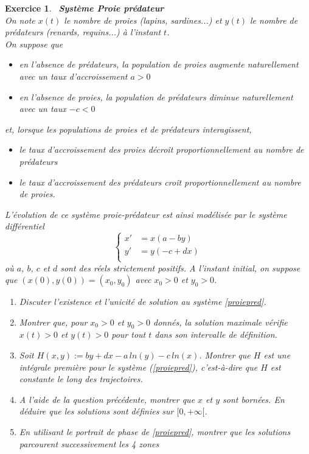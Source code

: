 \documentclass[11pt]{article}
\theoremstyle{exostyle}
\newtheorem{exercice}{Exercice}
\begin{document}
\begin{exercice}~{\bf Système Proie prédateur} \\
On note $x(t)$ le nombre de proies (lapins, sardines...) et $y(t)$ le nombre de prédateurs (renards, requins...) à l'instant $t$. \\
On suppose que 
\begin{itemize}
\item en l'absence de prédateurs, la population de  proies augmente naturellement avec un taux d'accroissement $a>0$ 
\item en l'absence de proies, la population de prédateurs diminue naturellement avec un taux $-c<0$
\end{itemize}
et, lorsque les populations de proies et de prédateurs interagissent,
\begin{itemize}
\item le taux d'accroissement des proies décroît proportionnellement au nombre de prédateurs 
\item  le taux d'accroissement des prédateurs croît proportionnellement au nombre de proies. 
\end{itemize}
L'évolution de ce système proie-prédateur est ainsi modélisée par le système différentiel
\begin{equation} \label{proiepred}
\left\{ 
\begin{aligned}
x' &= x(a  -by) \\
y' &= y(- c +dx) \\
\end{aligned} 
\right.
\end{equation}
où $a$, $b$, $c$ et $d$ sont des réels strictement positifs. A l'instant initial, on suppose que $(x(0), y(0))=(x_0 , y_0 )$ avec $x_0 > 0$ et $y_0 > 0$.
\begin{enumerate}
  \item  Discuter l'existence et l'unicité de solution au système  \eqref{proiepred}.
  \item Montrer que, pour $x_0 > 0$  et $y_0 > 0$ donnés, la solution maximale vérifie $x(t) > 0$ et $y(t) > 0$ pour tout $t$ dans son intervalle
de définition. 
  \item Soit $H(x, y) := by+dx -a\,ln(y) -c \,ln(x)$. Montrer que $H $ est une intégrale
première pour le système (\ref{proiepred}), c'est-à-dire que $H$ est constante le long des trajectoires.
\item A l'aide de la question précédente, montrer que $x$ et $y$ sont bornées. En déduire que les solutions sont définies sur $[0 , +\infty[$.
  \item  En utilisant le portrait de phase de  \eqref{proiepred}, montrer que les solutions parcourent successivement les 4 zones

\end{enumerate}
\end{exercice}
\end{document}
